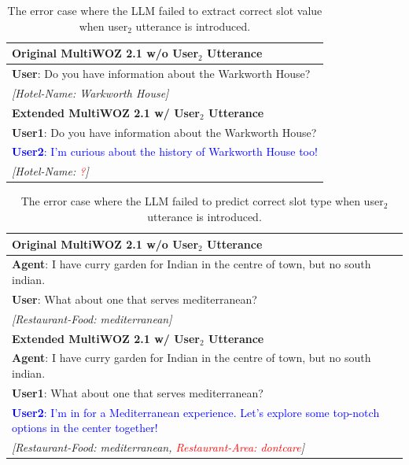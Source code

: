 \begin{table}[t!]
\centering
\small

\begin{tabularx}{\columnwidth}{|X|}
\hline
\textbf{Original MultiWOZ 2.1 w/o User$_2$ Utterance}\\
\hline
\textbf{User}: Do you have information about the Warkworth House?\\
\textit{[Hotel-Name: Warkworth House]}\\

\hline
\textbf{Extended MultiWOZ 2.1 w/ User$_2$ Utterance}\\
\hline
\textbf{User1}: Do you have information about the Warkworth House?\\
\textcolor{blue}{\textbf{User2}: I'm curious about the history of Warkworth House too!}\\
\textit{[Hotel-Name: \textcolor{red}{?}]}\\

\hline

\end{tabularx}
\caption{The error case where the LLM failed to extract correct slot value when user$_2$ utterance is introduced.}
\label{tab:error-analysis-1}
\end{table}

\begin{table}[t!]
\centering
\small

\begin{tabularx}{\columnwidth}{|X|}
\hline
\textbf{Original MultiWOZ 2.1 w/o User$_2$ Utterance}\\
\hline
\textbf{Agent}: I have curry garden for Indian in the centre of town, but no south indian.\\
\textbf{User}: What about one that serves mediterranean?\\
\textit{[Restaurant-Food: mediterranean]}\\

\hline
\textbf{Extended MultiWOZ 2.1 w/ User$_2$ Utterance}\\
\hline
\textbf{Agent}: I have curry garden for Indian in the centre of town, but no south indian. \\
\textbf{User1}: What about one that serves mediterranean?\\
\textcolor{blue}{\textbf{User2}: I'm in for a Mediterranean experience. Let's explore some top-notch options in the center together!}\\
\textit{[Restaurant-Food: mediterranean, \textcolor{red}{Restaurant-Area: dontcare}]}\\

\hline

\end{tabularx}
\caption{The error case where the LLM failed to predict correct slot type when user$_2$ utterance is introduced.}
\label{tab:error-analysis-2}
\end{table}



